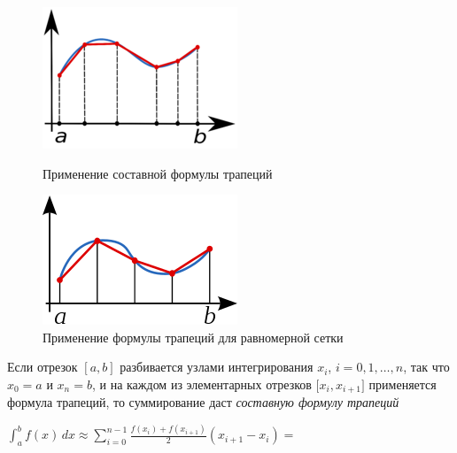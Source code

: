 \documentclass[a4paper]{article}
\begin{document}
{{{{{{{{\begin{figure}[!htb]
   \begin{minipage}{0.48\textwidth}
     \centering
     \includegraphics[width=.8\linewidth]{images/trapezium-1.png}
     \caption{Применение составной формулы трапеций}\label{fig:image-1-1-a}
   \end{minipage}\hfill
   \begin{minipage}{0.48\textwidth}
     \centering
     \includegraphics[width=.8\linewidth]{images/trapezium-2.png}
     \caption{Применение формулы трапеций для равномерной сетки}\label{fig:image-1-1-b}
   \end{minipage}
\end{figure}

Если отрезок {{\(\left\lbrack {a,b} \right\rbrack\)}} разбивается узлами
интегрирования {{\(x_{i}\)}}, {{\(i = 0,1,\ldots,n\)}}, так что
{{\(x_{0} = a\)}} и {{\(x_{n} = b\)}}, и на каждом из элементарных
отрезков {{\(\lbrack x_{i},x_{i + 1}\rbrack\)}} применяется формула
трапеций, то суммирование даст \emph{составную формулу трапеций}

\begin{center}
 {{\(\int_{a}^{b}f(x)\, dx \approx \sum\limits_{i = 0}^{n - 1}\frac{f(x_{i}) + f(x_{i + 1})}{2}(x_{i + 1} - x_{i}) =\)}}


\end{center}}}}}}}}}
\end{document}
